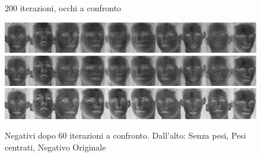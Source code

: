 \documentclass[a4paper]{article} %
\begin{document}
\begin{figure}
  \caption{200 iterazioni, occhi a confronto}
\end{figure}

\begin{figure}
  \subfigure
  {\includegraphics[scale=0.45]{img/negUV_noW.eps}}
  \subfigure
  {\includegraphics[scale=0.45]{img/negUV.eps}}
  \subfigure
  {\includegraphics[scale=0.45]{img/negA.eps}}
  \caption{Negativi dopo 60 iterazioni a confronto. Dall'alto: Senza pesi, Pesi centrati, Negativo Originale}
\end{figure}


\newpage

\clearpage{} %

\end{document}

